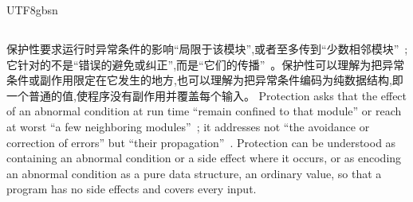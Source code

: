 \begin{CJK*}{UTF8}{gbsn}
\subsection{}
\label{sec:prior-protection}
\ifPaperChinese
保护性要求运行时异常条件的影响``局限于该模块'',或者至多传到``少数相邻模块''~\cite[第~45~页]{meyer1997-object-oriented-software-construction};它针对的不是``错误的避免或纠正'',而是``它们的传播''~\cite[第~46~页]{meyer1997-object-oriented-software-construction}。保护性可以理解为把异常条件或副作用限定在它发生的地方,也可以理解为把异常条件编码为纯数据结构,即一个普通的值,使程序没有副作用并覆盖每个输入。
\else
Protection asks that the effect of an abnormal condition at run time ``remain confined to that module''
or reach at worst ``a few neighboring
modules''~\cite[p.~45]{meyer1997-object-oriented-software-construction}; it addresses not ``the
avoidance or correction of errors'' but ``their
propagation''~\cite[p.~46]{meyer1997-object-oriented-software-construction}.
Protection can be understood as containing an abnormal condition or a side effect where it occurs, or as
encoding an abnormal condition as a pure data structure, an ordinary value, so that a program has no
side effects and covers every input.
\fi


\end{CJK*}
